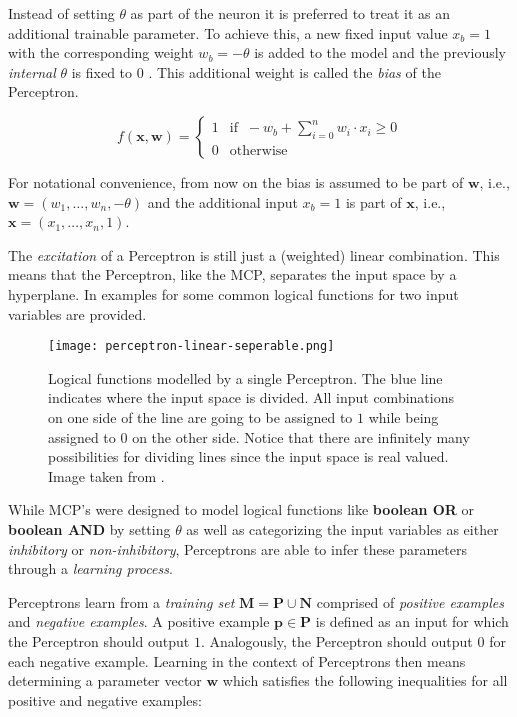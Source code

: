 Instead of setting $\theta$ as part of the neuron it is preferred to treat it as an additional trainable parameter.
To achieve this, a new fixed input value $x_b = 1$ with the corresponding weight $w_b = -\theta$ is added to the model and the previously \emph{internal} $\theta$ is fixed to $0$ .
This additional weight is called the \textit{bias} of the Perceptron.

\begin{equation}
    \label{eq:full-perceptron}
    f(\bm{x}, \bm{w}) =
    \begin{cases}
        1 & \text{if } ~ -w_b + \sum_{i=0}^n w_i \cdot x_i \geq 0 \\
        0 & \text{otherwise}
    \end{cases}
\end{equation}

For notational convenience, from now on the bias is assumed to be part of $\bm{w}$, i.e., $\bm{w} = (w_1, \dots, w_n, -\theta)$ and the additional input $x_b = 1$ is part of $\bm{x}$, i.e., $\bm{x} = (x_1, \dots, x_n, 1)$.

The \textit{excitation} of a Perceptron is still just a (weighted) linear combination.
This means that the Perceptron, like the MCP, separates the input space by a hyperplane.
In  examples for some common logical functions for two input variables are provided.

\begin{figure}[htb!]
    \texttt{[image: perceptron-linear-seperable.png]}
    \caption{Logical functions modelled by a single Perceptron. The blue line indicates where the input space is divided. All input combinations on one side of the line are going to be assigned to $1$ while being assigned to $0$ on the other side. Notice that there are infinitely many possibilities for dividing lines since the input space is real valued. Image taken from \cite{rudolph_lecture_2018}.}
    \label{fig:perceptron-logic}
\end{figure}

While MCP's were designed to model logical functions like \textbf{boolean OR} or \textbf{boolean AND} by setting $\theta$ as well as categorizing the input variables as either \textit{inhibitory} or \textit{non-inhibitory}, Perceptrons are able to infer these parameters through a \textit{learning process}.

Perceptrons learn from a \textit{training set} $\bm{M} = \bm{P} \cup \bm{N}$ comprised of \textit{positive examples} and \textit{negative examples}.
A positive example $\bm{p} \in \bm{P}$ is defined as an input for which the Perceptron should output $1$.
Analogously, the Perceptron should output $0$ for each negative example.
Learning in the context of Perceptrons then means determining a parameter vector $\bm{w}$ which satisfies the following inequalities for all positive and negative examples:

